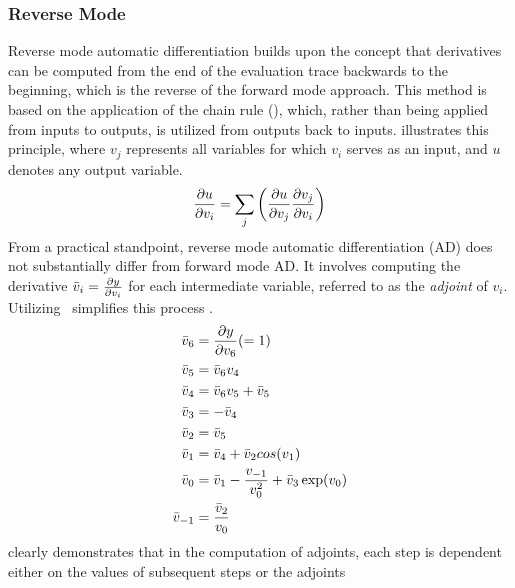 \subsubsection{Reverse Mode}
Reverse mode automatic differentiation builds upon the concept that derivatives
can be computed from the end of the evaluation trace backwards to the beginning,
which is the reverse of the forward mode approach. This method is based on the
application of the chain rule (), which, rather than being applied
from inputs to outputs, is utilized from outputs back to inputs. 
illustrates this principle, where $v_j$ represents all variables for which $v_i$
serves as an input, and $u$ denotes any output variable.
\begin{equation}
    \labeq{2_10}
    \der{u}{v_i} = \sum_j \left( \der{u}{v_j}\der{v_j}{v_i} \right)
\end{equation}
From a practical standpoint, reverse mode automatic differentiation (AD) does
not substantially differ from forward mode AD. It involves computing the
derivative $\bar{v}_i=\frac{\partial y}{\partial v_i}$ for each intermediate variable, referred to
as the \emph{adjoint} of $v_i$. Utilizing~ simplifies this
process .
\begin{equation}
    \labeq{2_11}
    \begin{split}
        \bar{v}_6 &= \der{y}{v_6} (=1)\\
        \bar{v}_5 &= \bar{v}_6 v_4\\
        \bar{v}_4 &= \bar{v}_6 v_5 + \bar{v}_5\\
        \bar{v}_3 &= -\bar{v}_4\\
        \bar{v}_2 &= \bar{v}_5\\
        \bar{v}_1 &= \bar{v}_4 + \bar{v}_2 cos(v_1)\\
        \bar{v}_0 &= \bar{v}_1 - \frac{v_{-1}}{v_0^2} + \bar{v}_3 \exp(v_0)\\
        \bar{v}_{-1} &= \frac{\bar{v}_2}{v_0}\\
    \end{split}
\end{equation}
 clearly demonstrates that in the computation of adjoints,
each step is dependent either on the values of subsequent steps or the adjoints
